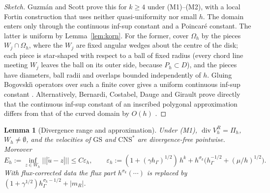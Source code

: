\documentclass[pdflatex,sn-mathphys-num]{sn-jnl}
\theoremstyle{thmstyleone}
\newtheorem{lemma}[theorem]{Lemma}
\theoremstyle{thmstylethree}
\newcommand{\hG}{h_\Gamma}
\newcommand{\Oh}{\Omega_h}
\newcommand{\VR}{V_h^R}
\newcommand{\Pih}{\Pi_h}
\newcommand{\Wh}{W_h}
\newcommand{\ut}{\tilde u}
\newcommand{\tnorm}[1]{|\!|\!|#1|\!|\!|}
\newcommand{\GS}{\mathrm{GS}}
\newcommand{\CNS}{\mathrm{CNS}^\ast}
\newcommand{\eps}{\varepsilon_h}
\renewcommand{\div}{\operatorname{div}}
\begin{document}
\begin{proof}[Sketch]
Guzm\'an and Scott \cite[Theorem~1]{GuzmanScott2019} prove this for $k\ge4$ under (M1)--(M2), with a local Fortin construction that uses neither quasi-uniformity nor small $h$. The domain enters only through the continuous inf-sup constant and a Poincar\'e constant. The latter is uniform by Lemma~\ref{lem:korn}. For the former, cover $\Oh$ by the pieces $W_j\cap\Oh$, where the $W_j$ are fixed angular wedges about the centre of the disk; each piece is star-shaped with respect to a ball of fixed radius (every chord line meeting $W_j$ leaves the ball on its outer side, because $P_h\subset D$), and the pieces have diameters, ball radii and overlaps bounded independently of $h$. Gluing Bogovski\u{\i} operators over such a finite cover gives a uniform continuous inf-sup constant \cite{PadhiExt}. Alternatively, Bernardi, Costabel, Dauge and Girault prove directly that the continuous inf-sup constant of an inscribed polygonal approximation differs from that of the curved domain by $O(h)$ \cite[Theorem~4.6]{BCDG2016}. %
\end{proof}

\begin{lemma}[Divergence range and approximation]\label{lem:approx}
Under (M1), $\div\VR=\Pih$, $\Wh\ne\emptyset$, and the velocities of $\GS$ and $\CNS$ are divergence-free pointwise. Moreover
\[
E_h:=\inf_{z\in\Wh}\tnorm{\ut-z}\le C\eps,\qquad \eps:=(1+(\gamma\hG)^{1/2})\,h^k+h^{\sigma_k}\bigl(\hG^{-1/2}+(\mu/h)^{1/2}\bigr).
\]
With flux-corrected data the flux part $h^{\sigma_k}(\cdots)$ is replaced by $(1+\gamma^{1/2})\hG^{\sigma_k-1/2}+|m_R|$.
\end{lemma}
\end{document}
